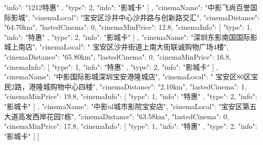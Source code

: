 {{{{                        "info": "1212特惠"
                    },
                    {
                        "type": 2,
                        "info": "影城卡"
                    }
                ]
            },
            {
                "cinemaName": "中影飞尚百誉国际影城",
                "cinemaLocal": "宝安区沙井中心沙井路与创新路交汇",
                "cinemaDistance": "64.70km",
                "lastedCinema": 0,
                "cinemaMinPrice": 12.8,
                "cinemaInfo": [
                    {
                        "type": 1,
                        "info": "特惠"
                    },
                    {
                        "type": 2,
                        "info": "影城卡"
                    }
                ]
            },
            {
                "cinemaName": "深圳东影南国国际影城上南店",
                "cinemaLocal": " 宝安区沙井街道上南大街联诚购物广场4楼",
                "cinemaDistance": "65.80km",
                "lastedCinema": 0,
                "cinemaMinPrice": 16.8,
                "cinemaInfo": [
                    {
                        "type": 1,
                        "info": "特惠"
                    },
                    {
                        "type": 2,
                        "info": "影城卡"
                    }
                ]
            },
            {
                "cinemaName": "中影国际影城深圳宝安港隆城店",
                "cinemaLocal": " 宝安区80区宝民2路，港隆城购物中心四楼",
                "cinemaDistance": "2.10km",
                "lastedCinema": 1,
                "cinemaMinPrice": 19.8,
                "cinemaInfo": [
                    {
                        "type": 1,
                        "info": "特惠"
                    },
                    {
                        "type": 2,
                        "info": "影城卡"
                    }
                ]
            },
            {
                "cinemaName": "中影ul城市影院宝安店",
                "cinemaLocal": "宝安区第五大道高发西岸花园7栋",
                "cinemaDistance": "63.58km",
                "lastedCinema": 0,
                "cinemaMinPrice": 17.8,
                "cinemaInfo": [
                    {
                        "type": 1,
                        "info": "特惠"
                    },
                    {
                        "type": 2,
                        "info": "影城卡"
                    }
                ]
            }
        ]
    }
}
